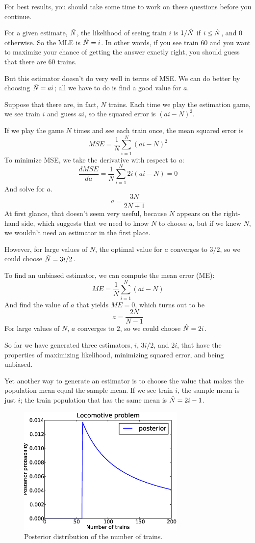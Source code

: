 \documentclass[12pt]{book}
\begin{document}
For best results, you should take some time to work on these questions
before you continue.

For a given estimate, $\hat{N}$, the likelihood of seeing train $i$ is
$1 / \hat{N}$ if $i \le \hat{N}$, and 0 otherwise.  So the MLE is $\hat{N} =
i$.  In other words, if you see train 60 and you want to maximize your
chance of getting the answer exactly right, you should guess that there
are 60 trains.

But this estimator doesn't do very well in terms of MSE.  We can do
better by choosing $\hat{N} = a i$; all we have to do is find a good
value for $a$.

Suppose that there are, in fact, $N$ trains.  Each time we play
the estimation game, we see train $i$ and guess $ai$, so the squared
error is $(ai - N)^2$.

If we play the game $N$ times and see each train once, the mean
squared error is 
%
\[ MSE = \frac{1}{N} \sum_{i=1}^N (ai - N)^2 \]
%
To minimize MSE, we take the derivative with respect to $a$:
%
\[ \frac{d MSE}{da} = \frac{1}{N} \sum_{i=1}^N 2i (ai - N) = 0 \]
%
And solve for $a$.
%
\[ a = \frac{3N}{2N+1} \]
%
At first glance, that doesn't seem very useful, because $N$ appears on
the right-hand side, which suggests that we need to know $N$ to choose
$a$, but if we knew $N$, we wouldn't need an estimator in the first place.

However, for large values of $N$, the optimal value for $a$ converges
to $3/2$, so we could choose $\hat{N} = 3i / 2$.

To find an unbiased estimator, we can compute the mean error (ME):
%
\[ ME = \frac{1}{N} \sum_{i=1}^N (ai - N) \]
%
And find the value of $a$ that yields $ME = 0$, which turns out to be
%
\[ a = \frac{2N}{N-1}\]
%
For large values of $N$, $a$ converges to $2$, so we could choose
$\hat{N} = 2i$.

So far we have generated three estimators, $i$, $3i/2$, and $2i$,
that have the properties of maximizing likelihood, minimizing squared
error, and being unbiased.

Yet another way to generate an estimator is to choose the value
that makes the population mean equal the sample mean.  If we see train
$i$, the sample mean is just $i$; the train population that has the
same mean is $\hat{N} = 2i - 1$.

\begin{figure}
\centerline{\includegraphics[height=2.5in]{figs/locomotive.eps}}
\caption{Posterior distribution of the number of trains.}
\label{locomotive}
\end{figure}
\end{document}
